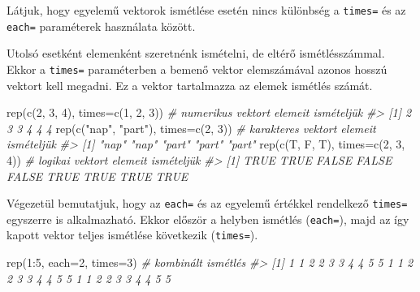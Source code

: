 \documentclass[
]{book}
\newenvironment{Shaded}{\begin{snugshade}}{\end{snugshade}}
\newcommand{\AttributeTok}[1]{\textcolor[rgb]{0.77,0.63,0.00}{#1}}
\newcommand{\CommentTok}[1]{\textcolor[rgb]{0.56,0.35,0.01}{\textit{#1}}}
\newcommand{\DecValTok}[1]{\textcolor[rgb]{0.00,0.00,0.81}{#1}}
\newcommand{\FunctionTok}[1]{\textcolor[rgb]{0.00,0.00,0.00}{#1}}
\newcommand{\NormalTok}[1]{#1}
\newcommand{\SpecialCharTok}[1]{\textcolor[rgb]{0.00,0.00,0.00}{#1}}
\newcommand{\StringTok}[1]{\textcolor[rgb]{0.31,0.60,0.02}{#1}}
\begin{document}
Látjuk, hogy egyelemű vektorok ismétlése esetén nincs különbség a \texttt{times=} és az \texttt{each=} paraméterek használata között.

Utolsó esetként elemenként szeretnénk ismételni, de eltérő ismétlésszámmal. Ekkor a \texttt{times=} paraméterben a bemenő vektor elemszámával azonos hosszú vektort kell megadni. Ez a vektor tartalmazza az elemek ismétlés számát.

\begin{Shaded}
\begin{Highlighting}[]
\FunctionTok{rep}\NormalTok{(}\FunctionTok{c}\NormalTok{(}\DecValTok{2}\NormalTok{, }\DecValTok{3}\NormalTok{, }\DecValTok{4}\NormalTok{), }\AttributeTok{times=}\FunctionTok{c}\NormalTok{(}\DecValTok{1}\NormalTok{, }\DecValTok{2}\NormalTok{, }\DecValTok{3}\NormalTok{))    }\CommentTok{\# numerikus vektort elemeit ismételjük}
\CommentTok{\#\textgreater{} [1] 2 3 3 4 4 4}
\FunctionTok{rep}\NormalTok{(}\FunctionTok{c}\NormalTok{(}\StringTok{"nap"}\NormalTok{, }\StringTok{"part"}\NormalTok{), }\AttributeTok{times=}\FunctionTok{c}\NormalTok{(}\DecValTok{2}\NormalTok{, }\DecValTok{3}\NormalTok{)) }\CommentTok{\# karakteres vektort elemeit ismételjük}
\CommentTok{\#\textgreater{} [1] "nap"  "nap"  "part" "part" "part"}
\FunctionTok{rep}\NormalTok{(}\FunctionTok{c}\NormalTok{(T, F, T), }\AttributeTok{times=}\FunctionTok{c}\NormalTok{(}\DecValTok{2}\NormalTok{, }\DecValTok{3}\NormalTok{, }\DecValTok{4}\NormalTok{))    }\CommentTok{\# logikai vektort elemeit ismételjük}
\CommentTok{\#\textgreater{} [1]  TRUE  TRUE FALSE FALSE FALSE  TRUE  TRUE  TRUE  TRUE}
\end{Highlighting}
\end{Shaded}

Végezetül bemutatjuk, hogy az \texttt{each=} és az egyelemű értékkel rendelkező \texttt{times=} egyszerre is alkalmazható. Ekkor először a helyben ismétlés (\texttt{each=}), majd az így kapott vektor teljes ismétlése következik (\texttt{times=}).

\begin{Shaded}
\begin{Highlighting}[]
\FunctionTok{rep}\NormalTok{(}\DecValTok{1}\SpecialCharTok{:}\DecValTok{5}\NormalTok{, }\AttributeTok{each=}\DecValTok{2}\NormalTok{, }\AttributeTok{times=}\DecValTok{3}\NormalTok{) }\CommentTok{\# kombinált ismétlés}
\CommentTok{\#\textgreater{}  [1] 1 1 2 2 3 3 4 4 5 5 1 1 2 2 3 3 4 4 5 5 1 1 2 2 3 3 4 4 5 5}
\end{Highlighting}
\end{Shaded}
\end{document}
